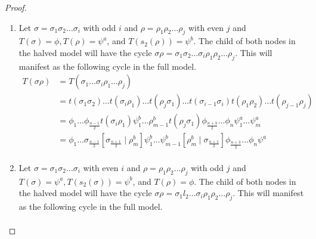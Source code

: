 \begin{proof} \phantom{x}
    \begin{enumerate}
        \item Let $\sigma = \sigma_1\sigma_2 \dots \sigma_i$ with odd $i$ and $\rho = \rho_1\rho_2 \dots \rho_j$ with even $j$ and $T(\sigma) = \phi, T(\rho) = \psi^a$, and $T(s_2(\rho)) = \psi^b$.
              The child of both nodes in the halved model will have the cycle $\sigma\rho = \sigma_1\sigma_2 \dots \sigma_i \rho_1\rho_2 \dots \rho_j$.
              This will manifest as the following cycle in the full model.
              \begin{align*}
                  T(\sigma\rho) & = T(\sigma_1 \dots \sigma_i \rho_1 \dots \rho_j)                                                                              \\
                                & =
                  t(\sigma_1\sigma_2) \dots t(\sigma_i \rho_1) \dots t(\rho_j \sigma_1) \dots t(\sigma_{i-1}\sigma_i) t(\rho_1\rho_2) \dots t(\rho_{j-1}\rho_j) \\
                                & = \phi_1 \dots \phi_{\frac{n-1}{2}} t(\sigma_i \rho_1)
                  \psi^b_1 \dots \rho^b_{m-1} t(\rho_j \sigma_1)
                  \phi_{\frac{n+3}{2}} \dots \phi_n
                  \psi^a_1 \dots \psi^a_m                                                                                                                       \\
                                & =
                  \phi_1 \dots \sigma_{\frac{n-1}{2}} \left[\sigma_{\frac{n+1}{2}} \mid \rho^b_m\right]
                  \psi^b_1 \dots \psi^b_{m-1} \left[\rho^b_m \mid \sigma_{\frac{n+1}{2}}\right]
                  \phi_{\frac{n+3}{2}} \dots \phi_n
                  \psi^a                                                                                                                                        \\
              \end{align*}
        \item Let $\sigma = \sigma_1\sigma_2 \dots \sigma_i$ with even $i$ and $\rho = \rho_1\rho_2 \dots \rho_j$ with odd $j$ and $T(\sigma) = \psi^a, T(s_2(\sigma)) = \psi^b$, and $T(\rho) = \phi$.
              The child of both nodes in the halved model will have the cycle $\sigma\rho = \sigma_1l_2 \dots \sigma_i \rho_1\rho_2 \dots \rho_j$.
              This will manifest as the following cycle in the full model.
              \begin{align*}

\end{align*}
\end{enumerate}
\end{proof}
